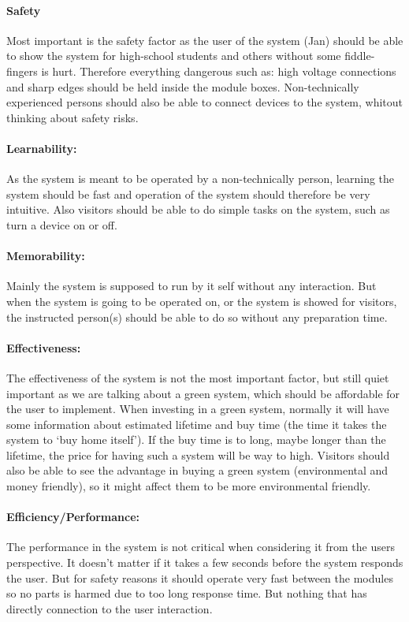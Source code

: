 \paragraph{Safety}
Most important is the safety factor as the user of the system (Jan) should be able to show the system for high-school students and others without some fiddle-fingers is hurt. Therefore everything dangerous such as: high voltage connections and sharp edges should be held inside the module boxes.
Non-technically experienced persons should also be able to connect devices to the system, whitout thinking about safety risks. 
\paragraph{Learnability:}
As the system is meant to be operated by a non-technically person, learning the system should be fast and operation of the system should therefore be very intuitive. 
Also visitors should be able to do simple tasks on the system, such as turn a device on or off.
\paragraph{Memorability:}
Mainly the system is supposed to run by it self without any interaction. But when the system is going to be operated on, or the system is showed for visitors, the instructed person(s) should be able to do so without any preparation time.
\paragraph{Effectiveness:}
The effectiveness of the system is not the most important factor, but still quiet important as we are talking about a green system, which should be
affordable for the user to implement. When investing in a green system, normally it will have some information about estimated lifetime and buy time (the time it takes the system to `buy home itself'). If the buy time is to long, maybe longer than the lifetime, the price for having such a system will be way to high. Visitors should also be able to see the advantage in buying a green system (environmental and money friendly), so it might affect them to be more environmental friendly. 
\paragraph{Efficiency/Performance:}
The performance in the system is not critical when considering it from the users perspective. It doesn't matter if it takes a few seconds before the system responds the user. But for safety reasons it should operate very fast between the modules so no parts is harmed due to too long response time. But nothing that has directly connection to the user interaction.
